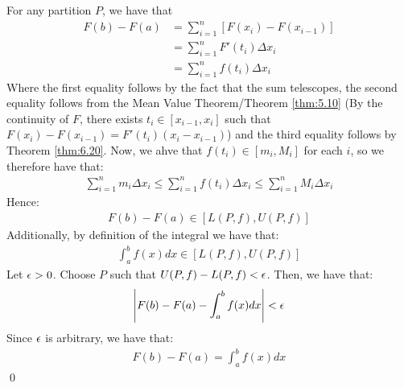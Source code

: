\begin{nproof}
    For any partition $P$, we have that
    \begin{align*}
        F(b) - F(a) &= \sum_{i=1}^n \left[F(x_i) - F(x_{i-1})\right]
        \\ &= \sum_{i=1}^n F'(t_i) \Delta x_i
        \\ &= \sum_{i=1}^n f(t_i) \Delta x_i
    \end{align*}
    Where the first equality follows by the fact that the sum telescopes, the second equality follows from the Mean Value Theorem/Theorem \ref{thm:5.10} (By the continuity of $F$, there exists $t_i \in [x_{i-1}, x_i]$ such that $F(x_i) - F(x_{i-1}) = F'(t_i)(x_i - x_{i-1})$) and the third equality follows by Theorem \ref{thm:6.20}. Now, we ahve that $f(t_i) \in [m_i, M_i]$ for each $i$, so we therefore have that:
    \begin{align*}
        \sum_{i=1}^n m_i \Delta x_i \leq \sum_{i=1}^n f(t_i)\Delta x_i \leq \sum_{i=1}^n M_i \Delta x_i
    \end{align*}
    Hence:
    \begin{align*}
        F(b) - F(a) \in [L(P, f), U(P, f)]
    \end{align*}
    Additionally, by definition of the integral we have that:
    \begin{align*}
        \int_a^b f(x)dx \in [L(P, f), U(P, f)]
    \end{align*}
    Let $\epsilon > 0$. Choose $P$ such that $U(P, f) - L(P, f) < \epsilon$. Then, we have that:
    \begin{align*}
        \abs{F(b) - F(a) - \int_a^b f(x)dx} < \epsilon
    \end{align*}
    Since $\epsilon$ is arbitrary, we have that:
    \begin{align*}
        F(b) - F(a) = \int_a^b f(x)dx
    \end{align*} \qed
\end{nproof}

